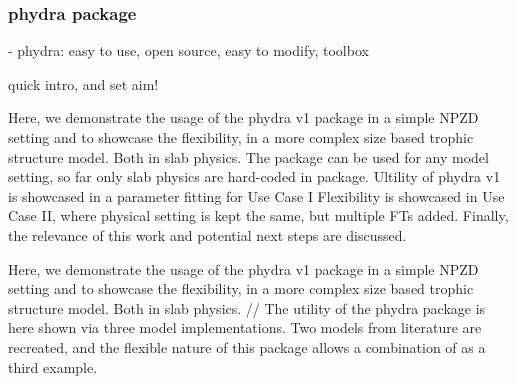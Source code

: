 \documentclass[journal abbreviation, manuscript]{copernicus}
\begin{document}
\subsubsection{phydra package}
- phydra: easy to use, open source, easy to modify, toolbox

quick intro, and set aim!

Here, we demonstrate the usage of the phydra v1 package in a simple NPZD setting and to showcase the flexibility, in a more complex size based trophic structure model. Both in slab physics.
The package can be used for any model setting, so far only slab physics are hard-coded in package.
Ultility of phydra v1 is showcased in a parameter fitting for Use Case I
Flexibility is showcased in Use Case II, where physical setting is kept the same, but multiple FTs added.
Finally, the relevance of this work and potential next steps are discussed.

Here, we demonstrate the usage of the phydra v1 package in a simple NPZD setting and to showcase the flexibility, in a more complex size based trophic structure model. Both in slab physics.
//
The utility of the phydra package is here shown via three model implementations. Two models from literature are recreated, and the flexible nature of this package allows a combination of as a third example. 
\end{document}
